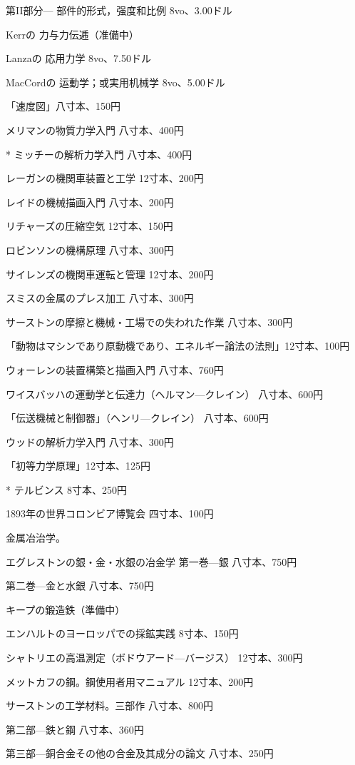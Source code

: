 \documentclass[a4paper,11pt,openany]{ltjsbook}
\begin{document}
第II部分— 部件的形式，强度和比例 8vo、3.00ドル

Kerrの 力与力伝逓（准備中）

Lanzaの 応用力学 8vo、7.50ドル

MacCordの 运動学；或実用机械学 8vo、5.00ドル

「速度図」八寸本、150円

メリマンの物質力学入門 八寸本、400円

* ミッチーの解析力学入門 八寸本、400円

レーガンの機関車装置と工学 12寸本、200円

レイドの機械描画入門 八寸本、200円

リチャーズの圧縮空気 12寸本、150円

ロビンソンの機構原理 八寸本、300円

サイレンズの機関車運転と管理 12寸本、200円

スミスの金属のプレス加工 八寸本、300円

サーストンの摩擦と機械・工場での失われた作業 八寸本、300円

「動物はマシンであり原動機であり、エネルギー論法の法則」12寸本、100円

ウォーレンの装置構築と描画入門 八寸本、760円

ワイスバッハの運動学と伝達力（ヘルマン—クレイン） 八寸本、600円

「伝送機械と制御器」（ヘンリ—クレイン） 八寸本、600円

ウッドの解析力学入門 八寸本、300円

「初等力学原理」12寸本、125円

* テルビンス 8寸本、250円

1893年の世界コロンビア博覧会 四寸本、100円

金属冶治学。

エグレストンの銀・金・水銀の冶金学 第一巻—銀 八寸本、750円

第二巻—金と水銀 八寸本、750円

キープの鍛造鉄（準備中）

エンハルトのヨーロッパでの採鉱実践 8寸本、150円

シャトリエの高温測定（ボドウアード—バージス） 12寸本、300円

メットカフの鋼。鋼使用者用マニュアル 12寸本、200円

サーストンの工学材料。三部作 八寸本、800円

第二部—鉄と鋼 八寸本、360円

第三部—銅合金その他の合金及其成分の論文 八寸本、250円
\end{document}
